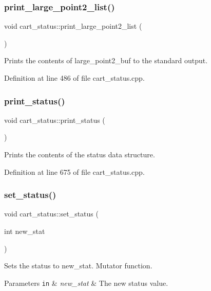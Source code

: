\subsubsection{\texorpdfstring{print\+\_\+large\+\_\+point2\+\_\+list()}{print\_large\_point2\_list()}}
{\footnotesize\ttfamily void cart\+\_\+status\+::print\+\_\+large\+\_\+point2\+\_\+list (\begin{DoxyParamCaption}{ }\end{DoxyParamCaption})}

Prints the contents of large\+\_\+point2\+\_\+buf to the standard output. 

Definition at line 486 of file cart\+\_\+status.\+cpp.

\mbox{\label{classcart__status_a41b5c0827d3f6c7bd051668dbd37e21a}} 
\subsubsection{\texorpdfstring{print\+\_\+status()}{print\_status()}}
{\footnotesize\ttfamily void cart\+\_\+status\+::print\+\_\+status (\begin{DoxyParamCaption}{ }\end{DoxyParamCaption})}

Prints the contents of the status data structure. 

Definition at line 675 of file cart\+\_\+status.\+cpp.

\mbox{\label{classcart__status_a5db1241aff0bd874c8d108666ec8b323}} 
\subsubsection{\texorpdfstring{set\+\_\+status()}{set\_status()}}
{\footnotesize\ttfamily void cart\+\_\+status\+::set\+\_\+status (\begin{DoxyParamCaption}\item[{int}]{new\+\_\+stat }\end{DoxyParamCaption})}

Sets the status to new\+\_\+stat. Mutator function. 
\begin{DoxyParams}[1]{Parameters}
\mbox{\tt in}  & {\em new\+\_\+stat} & The new status value. \\
\hline
\end{DoxyParams}


